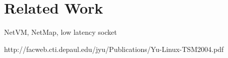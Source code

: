 \section{Related Work} \label{sec:related}

NetVM, NetMap, low latency socket

http://facweb.cti.depaul.edu/jyu/Publications/Yu-Linux-TSM2004.pdf